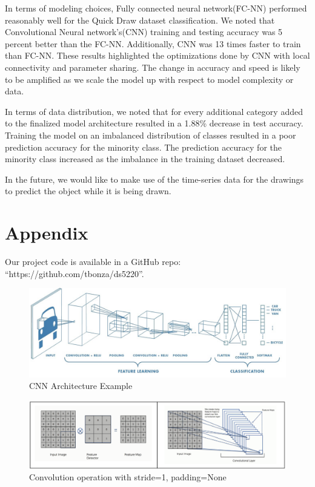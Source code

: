 \documentclass[11pt]{article}
\begin{document}
In terms of modeling choices, Fully connected neural network(FC-NN)
performed reasonably well for the Quick Draw dataset classification. We
noted that Convolutional Neural network’s(CNN) training and testing accuracy
was 5 percent better than the FC-NN. Additionally,  CNN was 13 times faster
to train than FC-NN. These results highlighted the optimizations done by
CNN with local connectivity and parameter sharing. The change in accuracy
and speed is likely to be amplified as we scale the model up with respect
to model complexity or data.

In terms of data distribution, we noted that for every additional category
added to the finalized model architecture resulted in a 1.88\% decrease in
test accuracy. Training the model on an imbalanced distribution of classes
resulted in a poor prediction accuracy for the minority class. The
prediction accuracy for the minority class increased as the imbalance in
the training dataset decreased.

In the future, we would like to make use of the time-series data for the
drawings to predict the object while it is being drawn.





\section{Appendix}

Our project code is available in a GitHub repo: ``https://github.com/tbonza/ds5220''.


\begin{figure}[h!]
  \begin{center}
    \includegraphics[scale=0.5]{fig5}
    \end{center}
  \caption{CNN Architecture Example}
  \label{fig:CNN}
\end{figure}

\begin{figure}[h!]
  \begin{center}
    \includegraphics[scale=0.5]{fig6}
    \end{center}
  \caption{Convolution operation with stride=1, padding=None}
  \label{fig:CNNStridePad}
\end{figure}
\end{document}
